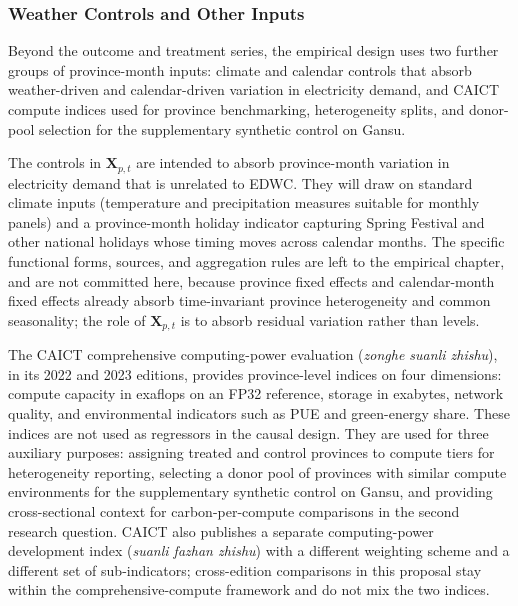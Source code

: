 \documentclass[12pt,a4paper]{article}
\begin{document}
\subsubsection{Weather Controls and Other Inputs}
%

Beyond the outcome and treatment series, the empirical design uses
two further groups of province-month inputs: climate and calendar
controls that absorb weather-driven and calendar-driven variation in
electricity demand, and CAICT compute indices used for province
benchmarking, heterogeneity splits, and donor-pool selection for the
supplementary synthetic control on Gansu.

The controls in $\mathbf{X}_{p,t}$ are intended to absorb
province-month variation in electricity demand that is unrelated to
EDWC. They will draw on standard climate inputs (temperature and
precipitation measures suitable for monthly panels) and a
province-month holiday indicator capturing Spring Festival and other
national holidays whose timing moves across calendar months. The
specific functional forms, sources, and aggregation rules are left to
the empirical chapter, and are not committed here, because province
fixed effects and calendar-month fixed effects already absorb
time-invariant province heterogeneity and common seasonality; the
role of $\mathbf{X}_{p,t}$ is to absorb residual variation rather
than levels.

The CAICT comprehensive computing-power evaluation
(\textit{zonghe suanli zhishu}), in its 2022 and 2023 editions,
provides province-level indices on four dimensions: compute capacity
in exaflops on an FP32 reference, storage in exabytes, network
quality, and environmental indicators such as PUE and green-energy
share. These indices are not used as regressors in the causal design.
They are used for three auxiliary purposes: assigning treated and
control provinces to compute tiers for heterogeneity reporting,
selecting a donor pool of provinces with similar compute environments
for the supplementary synthetic control on Gansu, and providing
cross-sectional context for carbon-per-compute comparisons in the
second research question. CAICT also publishes a separate
computing-power development index
(\textit{suanli fazhan zhishu}) with a different weighting scheme and
a different set of sub-indicators; cross-edition comparisons in this
proposal stay within the comprehensive-compute framework and do not
mix the two indices.
\end{document}
